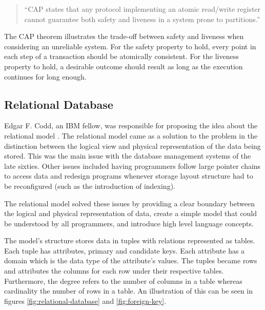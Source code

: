 \begin{quote}
    ``CAP states that any protocol implementing an atomic read/write register cannot guarantee both safety and liveness in a system prone to partitions.''
\end{quote}

The CAP theorem illustrates the trade-off between safety and liveness when considering an unreliable system. For the safety property to hold, every point in each step of a transaction should be atomically consistent. For the liveness property to hold, a desirable outcome should result as long as the execution continues for long enough.

\subsection{Relational Database}

Edgar F. Codd, an IBM fellow, was responsible for proposing the idea about the relational model \cite{relational-db}. The relational model came as a solution to the problem in the distinction between the logical view and physical representation of the data being stored. This was the main issue with the database management systems of the late sixties. Other issues included having programmers follow large pointer chains to access data and redesign programs whenever storage layout structure had to be reconfigured (such as the introduction of indexing).

The relational model solved these issues by providing a clear boundary between the logical and physical representation of data, create a simple model that could be understood by all programmers, and introduce high level language concepts.

The model's structure stores data in tuples with relations represented as tables. Each tuple has attributes, primary and candidate keys. Each attribute has a domain which is the data type of the attribute's values. The tuples became rows and attributes the columns for each row under their respective tables. Furthermore, the degree refers to the number of columns in a table whereas cardinality the number of rows in a table. An illustration of this can be seen in figures \ref{fig:relational-database} and \ref{fig:foreign-key}.


